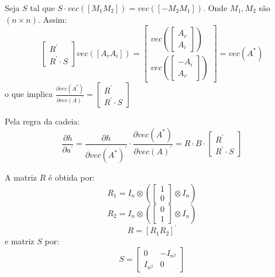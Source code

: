 \documentclass[a4paper,10pt]{article}
\begin{document}
Seja $S$ tal que $S \cdot vec([M_{1} M_{2}]) = vec([-M_{2} M_{1}])$. Onde $M_{1}, M_{2}$ são $(n \times n)$. Assim:
\begin{equation}
\left[ \begin{array}{c}
 R^{'} \\ R^{'} \cdot S
\end{array} \right] vec([A_{r} A_{i}]) = \left[ \begin{array}{c}
 vec(\left[ \begin{array}{c}
 A_{r} \\ A_{i}
\end{array} \right]
) \\ vec(\left[ \begin{array}{c}
 -A_{i} \\ A_{r}
\end{array} \right]
)
\end{array} \right] = vec(A^{\ast})
\end{equation}
o que implica $\frac{\partial vec(A^{\ast})}{\partial vec(A)^{'}} = \left[ \begin{array}{c}
 R^{'} \\ R^{'} \cdot S
\end{array} \right]$

Pela regra da cadeia:
\begin{equation}
\frac{\partial h}{\partial a^{'}} = \frac{\partial h}{\partial vec(A^{\ast})^{'}} \cdot \frac{\partial vec(A^{\ast})}{\partial vec(A)^{'}} = 
R \cdot B \cdot \left[ \begin{array}{c}
 R^{'} \\ R^{'} \cdot S
\end{array} \right]
\end{equation}

A matriz $R$ é obtida por:
\begin{equation}
R_{1} = I_{n} \otimes (\left[ \begin{array}{c} 1 \\ 0 \end{array} \right] \otimes I_{n})
\end{equation}
\begin{equation}
R_{2} = I_{n} \otimes (\left[ \begin{array}{c} 0 \\ 1 \end{array} \right] \otimes I_{n})
\end{equation}
\begin{equation}
R = [R_{1} R_{2}]^{'}
\end{equation}
e matriz $S$ por:
\begin{equation}
S = \left[ \begin{array}{cc}
 0 & -I_{n^{2}} \\
I_{n^{2}} & 0
\end{array} \right]
\end{equation}
\end{document}
